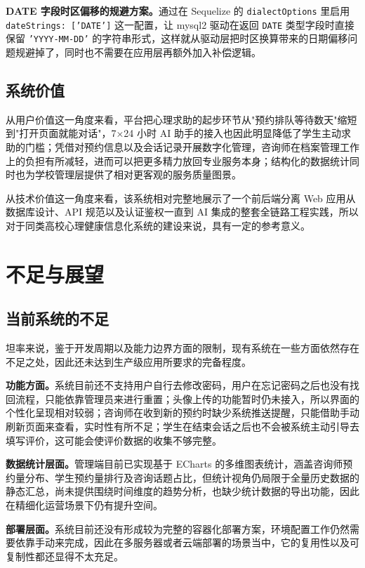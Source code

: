 \textbf{DATE 字段时区偏移的规避方案。}通过在 Sequelize 的 \texttt{dialectOptions} 里启用 \texttt{dateStrings: ['DATE']} 这一配置，让 mysql2 驱动在返回 \texttt{DATE} 类型字段时直接保留 \texttt{'YYYY-MM-DD'} 的字符串形式，这样就从驱动层把时区换算带来的日期偏移问题规避掉了，同时也不需要在应用层再额外加入补偿逻辑。

\subsection{系统价值}

从用户价值这一角度来看，平台把心理求助的起步环节从"预约排队等待数天"缩短到"打开页面就能对话"，7×24 小时 AI 助手的接入也因此明显降低了学生主动求助的门槛；凭借对预约信息以及会话记录开展数字化管理，咨询师在档案管理工作上的负担有所减轻，进而可以把更多精力放回专业服务本身；结构化的数据统计同时也为学校管理层提供了相对更客观的服务质量图景。

从技术价值这一角度来看，该系统相对完整地展示了一个前后端分离 Web 应用从数据库设计、API 规范以及认证鉴权一直到 AI 集成的整套全链路工程实践，所以对于同类高校心理健康信息化系统的建设来说，具有一定的参考意义。


\section{不足与展望}

\subsection{当前系统的不足}

坦率来说，鉴于开发周期以及能力边界方面的限制，现有系统在一些方面依然存在不足之处，因此还未达到生产级应用所要求的完备程度。

\textbf{功能方面。}系统目前还不支持用户自行去修改密码，用户在忘记密码之后也没有找回流程，只能依靠管理员来进行重置；头像上传的功能暂时仍未接入，所以界面的个性化呈现相对较弱；咨询师在收到新的预约时缺少系统推送提醒，只能借助手动刷新页面来查看，实时性有所不足；学生在结束会话之后也不会被系统主动引导去填写评价，这可能会使评价数据的收集不够完整。

\textbf{数据统计层面。}管理端目前已实现基于 ECharts 的多维图表统计，涵盖咨询师预约量分布、学生预约量排行及咨询话题占比，但统计视角仍局限于全量历史数据的静态汇总，尚未提供围绕时间维度的趋势分析，也缺少统计数据的导出功能，因此在精细化运营场景下仍有提升空间。

\textbf{部署层面。}系统目前还没有形成较为完整的容器化部署方案，环境配置工作仍然需要依靠手动来完成，因此在多服务器或者云端部署的场景当中，它的复用性以及可复制性都还显得不太充足。

